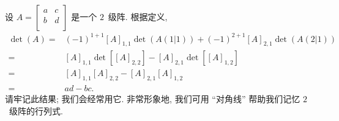 \documentclass[%
    UTF8,%
    fontset=none,%
    punct=kaiming,%
    zihao=-4,%
    a4paper,%
    oneside,%
]{ctexbook}
\begin{document}
\begin{example}
    设
    \(
    A = \begin{bmatrix}
        a & c \\
        b & d \\
    \end{bmatrix}
    \)
    是一个 \(2\)~级阵.
    根据定义,
    \begin{align*}
        \det {(A)}
        = {} & (-1)^{1+1} [A]_{1,1} \det {(A(1|1))}
        + (-1)^{2+1} [A]_{2,1} \det {(A(2|1))}           \\
        = {} & [A]_{1,1} \det {[[A]_{2,2}]}
        - [A]_{2,1} \det {[[A]_{1,2}]}                   \\
        = {} & [A]_{1,1} [A]_{2,2} - [A]_{2,1} [A]_{1,2} \\
        = {} & ad - bc.
    \end{align*}
    请牢记此结果;
    我们会经常用它.
    非常形象地, 我们可用 ``对角线'' 帮助我们记忆
    \(2\)~级阵的行列式.
    \begin{figure}[h!]
        \centering
    \end{figure}
\end{example}
\end{document}

